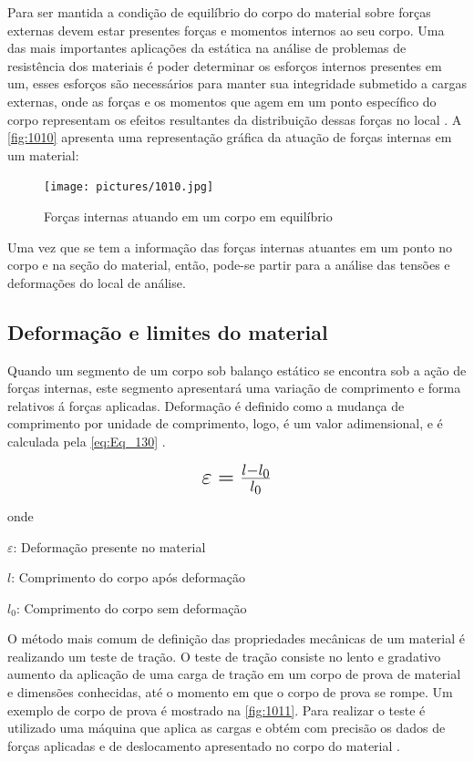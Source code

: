 Para ser mantida a condição de equilíbrio do corpo do material sobre forças externas devem estar presentes forças e momentos internos ao seu corpo.
Uma das mais importantes aplicações da estática na análise de problemas de resistência dos materiais é poder determinar os esforços internos
presentes em um, esses esforços são necessários para manter sua integridade submetido a cargas externas, onde as forças e os momentos que agem em um
ponto específico do corpo representam os efeitos resultantes da distribuição dessas forças no local \autocite{Hibbeler2010}.
A \autoref{fig:1010} apresenta uma representação gráfica da atuação de forças internas em um material:

\begin{figure}[htb]
	\caption{\label{fig:1010} Forças internas atuando em um corpo em equilíbrio}
	\begin{center}
		\texttt{[image: pictures/1010.jpg]}
	\end{center}
\end{figure}

Uma vez que se tem a informação das forças internas atuantes em um ponto no corpo e na seção do material, então, pode-se partir para a análise das tensões
e deformações do local de análise.

\subsection{Deformação e limites do material}

Quando um segmento de um corpo sob balanço estático se encontra sob a ação de forças internas, este segmento apresentará uma variação de comprimento e forma relativos
á forças aplicadas. Deformação é definido como a mudança de comprimento por unidade de comprimento, logo, é um valor adimensional,
e é calculada pela \autoref{eq:Eq_130} \autocite{Norton2011}.

\begin{equation}\label{eq:Eq_130}%
\mbox{\fontsize{17.28}{21.6}\selectfont\( %
\varepsilon = \frac{l - l_0}{l_0}
\)} %
\end{equation}

onde

$\varepsilon$: Deformação presente no material

$l$: Comprimento do corpo após deformação

$l_0$: Comprimento do corpo sem deformação

\hfill

O método mais comum de definição das propriedades mecânicas de um material é realizando um teste de tração.
O teste de tração consiste no lento e gradativo aumento da aplicação de uma carga de tração em um corpo de prova de material e dimensões conhecidas,
até o momento em que o corpo de prova se rompe.
Um exemplo de corpo de prova é mostrado na \autoref{fig:1011}.
Para realizar o teste é utilizado uma máquina que aplica as cargas e obtém com precisão os dados de forças aplicadas e de deslocamento apresentado
no corpo do material \autocite{Norton2011}.


